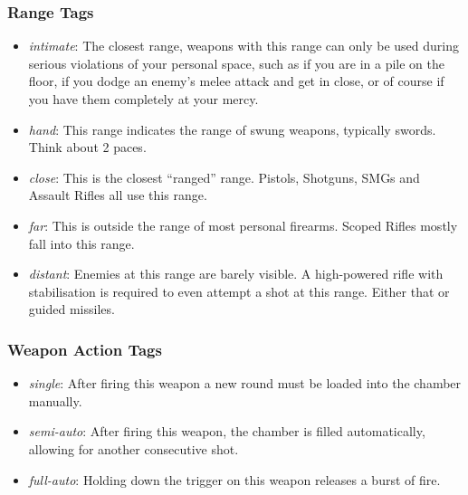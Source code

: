 \subsubsection{Range Tags}
\begin{itemize}
\item \textit{intimate}: The closest range, weapons with this range can only be used during serious violations of your personal space, such as if you are in a pile on the floor, if you dodge an enemy's melee attack and get in close, or of course if you have them completely at your mercy.
\item \textit{hand}: This range indicates the range of swung weapons, typically swords. Think about 2 paces.
\item \textit{close}: This is the closest ``ranged'' range. Pistols, Shotguns, SMGs and Assault Rifles all use this range.
\item \textit{far}: This is outside the range of most personal firearms. Scoped Rifles mostly fall into this range.
\item \textit{distant}: Enemies at this range are barely visible. A high-powered rifle with stabilisation is required to even attempt a shot at this range. Either that or guided missiles.
\end{itemize}

\subsubsection{Weapon Action Tags}
\begin{itemize}
\item \textit{single}: After firing this weapon a new round must be loaded into the chamber manually.
\item \textit{semi-auto}: After firing this weapon, the chamber is filled automatically, allowing for another consecutive shot.
\item \textit{full-auto}: Holding down the trigger on this weapon releases a burst of fire.
\end{itemize}

